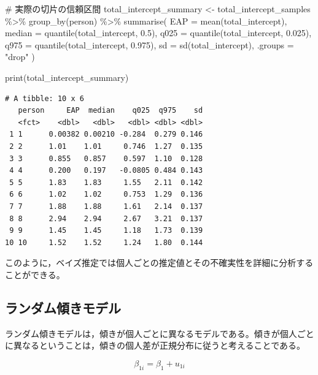\documentclass[
  a4paper,
]{ltjsbook}
\newenvironment{Shaded}{\begin{snugshade}}{\end{snugshade}}
\newcommand{\AttributeTok}[1]{\textcolor[rgb]{0.40,0.45,0.13}{#1}}
\newcommand{\CommentTok}[1]{\textcolor[rgb]{0.37,0.37,0.37}{#1}}
\newcommand{\FloatTok}[1]{\textcolor[rgb]{0.68,0.00,0.00}{#1}}
\newcommand{\FunctionTok}[1]{\textcolor[rgb]{0.28,0.35,0.67}{#1}}
\newcommand{\NormalTok}[1]{\textcolor[rgb]{0.00,0.23,0.31}{#1}}
\newcommand{\OtherTok}[1]{\textcolor[rgb]{0.00,0.23,0.31}{#1}}
\newcommand{\SpecialCharTok}[1]{\textcolor[rgb]{0.37,0.37,0.37}{#1}}
\newcommand{\StringTok}[1]{\textcolor[rgb]{0.13,0.47,0.30}{#1}}
\begin{document}
\begin{Shaded}
\begin{Highlighting}[]
\CommentTok{\# 実際の切片の信頼区間}
\NormalTok{total\_intercept\_summary }\OtherTok{\textless{}{-}}\NormalTok{ total\_intercept\_samples }\SpecialCharTok{\%\textgreater{}\%} 
  \FunctionTok{group\_by}\NormalTok{(person) }\SpecialCharTok{\%\textgreater{}\%} 
  \FunctionTok{summarise}\NormalTok{(}
    \AttributeTok{EAP =} \FunctionTok{mean}\NormalTok{(total\_intercept),}
    \AttributeTok{median =} \FunctionTok{quantile}\NormalTok{(total\_intercept, }\FloatTok{0.5}\NormalTok{),}
    \AttributeTok{q025 =} \FunctionTok{quantile}\NormalTok{(total\_intercept, }\FloatTok{0.025}\NormalTok{),}
    \AttributeTok{q975 =} \FunctionTok{quantile}\NormalTok{(total\_intercept, }\FloatTok{0.975}\NormalTok{),}
    \AttributeTok{sd =} \FunctionTok{sd}\NormalTok{(total\_intercept),}
    \AttributeTok{.groups =} \StringTok{"drop"}
\NormalTok{  )}

\FunctionTok{print}\NormalTok{(total\_intercept\_summary)}
\end{Highlighting}
\end{Shaded}

\begin{verbatim}
# A tibble: 10 x 6
   person     EAP  median    q025  q975    sd
   <fct>    <dbl>   <dbl>   <dbl> <dbl> <dbl>
 1 1      0.00382 0.00210 -0.284  0.279 0.146
 2 2      1.01    1.01     0.746  1.27  0.135
 3 3      0.855   0.857    0.597  1.10  0.128
 4 4      0.200   0.197   -0.0805 0.484 0.143
 5 5      1.83    1.83     1.55   2.11  0.142
 6 6      1.02    1.02     0.753  1.29  0.136
 7 7      1.88    1.88     1.61   2.14  0.137
 8 8      2.94    2.94     2.67   3.21  0.137
 9 9      1.45    1.45     1.18   1.73  0.139
10 10     1.52    1.52     1.24   1.80  0.144
\end{verbatim}

このように，ベイズ推定では個人ごとの推定値とその不確実性を詳細に分析することができる。

\subsection{ランダム傾きモデル}\label{ux30e9ux30f3ux30c0ux30e0ux50beux304dux30e2ux30c7ux30eb}

ランダム傾きモデルは，傾きが個人ごとに異なるモデルである。傾きが個人ごとに異なるということは，傾きの個人差が正規分布に従うと考えることである。

\[
\beta_{1i} = \beta_1 + u_{1i}
\]
\end{document}
